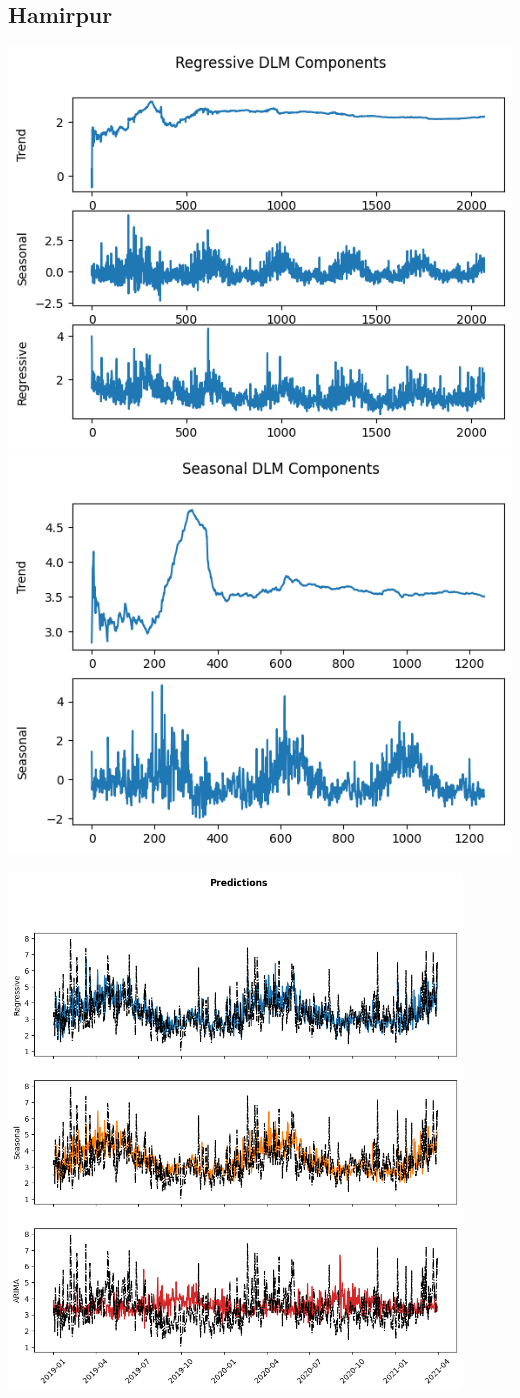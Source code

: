 \documentclass[a4paper,12pt]{article}
\begin{document}
\subsection{Hamirpur}
\label{sec:org5400ece}
\begin{center}
\includegraphics[width=0.45\linewidth]{./images/hamirpur/reg.png}
\includegraphics[width=0.45\linewidth]{./images/hamirpur/seas.png}
\end{center}

\begin{center}
\includegraphics[width=0.9\textwidth]{./images/hamirpur/pred.png}
\end{center}
\end{document}

